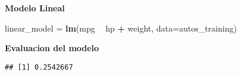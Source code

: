 \documentclass[]{article}
\newenvironment{Shaded}{\begin{snugshade}}{\end{snugshade}}
\newcommand{\CommentTok}[1]{\textcolor[rgb]{0.56,0.35,0.01}{\textit{#1}}}
\newcommand{\DataTypeTok}[1]{\textcolor[rgb]{0.13,0.29,0.53}{#1}}
\newcommand{\KeywordTok}[1]{\textcolor[rgb]{0.13,0.29,0.53}{\textbf{#1}}}
\newcommand{\NormalTok}[1]{#1}
\newcommand{\OperatorTok}[1]{\textcolor[rgb]{0.81,0.36,0.00}{\textbf{#1}}}
\newcommand{\StringTok}[1]{\textcolor[rgb]{0.31,0.60,0.02}{#1}}
\begin{document}
\textbf{Modelo Lineal}

\begin{Shaded}
\begin{Highlighting}[]
\NormalTok{linear_model =}\StringTok{ }\KeywordTok{lm}\NormalTok{(mpg }\OperatorTok{~}\StringTok{ }\NormalTok{hp }\OperatorTok{+}\StringTok{ }\NormalTok{weight, }
                  \DataTypeTok{data=}\NormalTok{autos_training)}
\end{Highlighting}
\end{Shaded}

\textbf{Evaluacion del modelo}

\begin{Shaded}
\end{Shaded}

\begin{verbatim}
## [1] 0.2542667
\end{verbatim}
\end{document}
